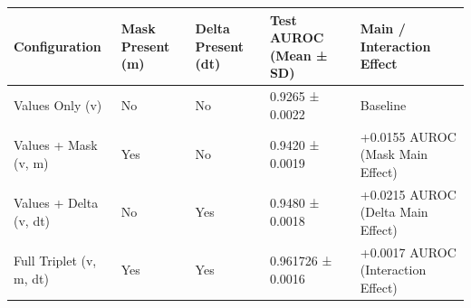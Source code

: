 \begin{tabular}{lllll}
\toprule
Configuration & Mask Present (m) & Delta Present (dt) & Test AUROC (Mean ± SD) & Main / Interaction Effect \\
\midrule
Values Only (v) & No & No & 0.9265 ± 0.0022 & Baseline \\
Values + Mask (v, m) & Yes & No & 0.9420 ± 0.0019 & +0.0155 AUROC (Mask Main Effect) \\
Values + Delta (v, dt) & No & Yes & 0.9480 ± 0.0018 & +0.0215 AUROC (Delta Main Effect) \\
Full Triplet (v, m, dt) & Yes & Yes & 0.961726 ± 0.0016 & +0.0017 AUROC (Interaction Effect) \\
\bottomrule
\end{tabular}
